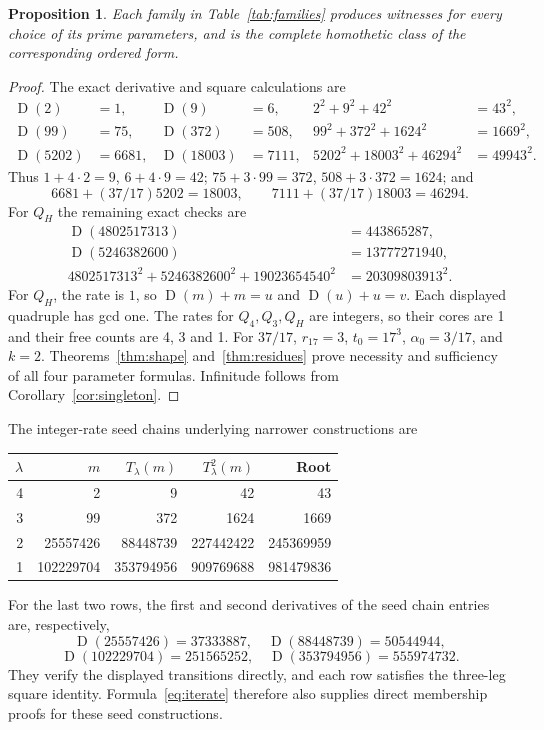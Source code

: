 \documentclass[11pt]{article}
\newcommand{\D}{\operatorname{D}}
\newtheorem{proposition}[theorem]{Proposition}
\theoremstyle{definition}
\begin{document}
\begin{proposition}\label{prop:families}
Each family in Table~\ref{tab:families} produces witnesses for every
choice of its prime parameters, and is the complete homothetic class of
the corresponding ordered form.
\end{proposition}
\begin{proof}
The exact derivative and square calculations are
\begin{align*}
 \D(2)&=1,& \D(9)&=6,& 2^2+9^2+42^2&=43^2,\\
 \D(99)&=75,& \D(372)&=508,& 99^2+372^2+1624^2&=1669^2,\\
 \D(5202)&=6681,& \D(18003)&=7111,&
 5202^2+18003^2+46294^2&=49943^2.
\end{align*}
Thus $1+4\cdot2=9$, $6+4\cdot9=42$;
$75+3\cdot99=372$, $508+3\cdot372=1624$; and
\[
 6681+(37/17)5202=18003,\qquad
 7111+(37/17)18003=46294.
\]
For $Q_H$ the remaining exact checks are
\begin{align*}
 \D(4802517313)&=443865287,\\
 \D(5246382600)&=13777271940,\\
 4802517313^2+5246382600^2+19023654540^2
   &=20309803913^2.
\end{align*}
For $Q_H$, the rate is $1$, so $\D(m)+m=u$ and $\D(u)+u=v$.
Each displayed quadruple has gcd one. The rates for $Q_4,Q_3,Q_H$
are integers, so their cores are 1 and their free counts are 4, 3 and 1.
For $37/17$, $r_{17}=3$, $t_0=17^3$, $\alpha_0=3/17$, and
$k=2$. Theorems~\ref{thm:shape} and~\ref{thm:residues} prove
necessity and sufficiency of all four parameter formulas. Infinitude
follows from Corollary~\ref{cor:singleton}.
\end{proof}

The integer-rate seed chains underlying narrower constructions are
\begin{center}\small
\begin{tabular}{rrrrr}
\toprule
$\lambda$ & $m$ & $T_\lambda(m)$ & $T_\lambda^2(m)$ & Root\\
\midrule
4 & 2 & 9 & 42 & 43\\
3 & 99 & 372 & 1624 & 1669\\
2 & 25557426 & 88448739 & 227442422 & 245369959\\
1 & 102229704 & 353794956 & 909769688 & 981479836\\
\bottomrule
\end{tabular}
\end{center}
For the last two rows, the first and second derivatives of the seed
chain entries are, respectively,
\[
 \D(25557426)=37333887,\quad \D(88448739)=50544944,
\]
\[
 \D(102229704)=251565252,\quad \D(353794956)=555974732.
\]
They verify the displayed transitions directly, and each row satisfies
the three-leg square identity. Formula~\eqref{eq:iterate} therefore
also supplies direct membership proofs for these seed constructions.
\end{document}
